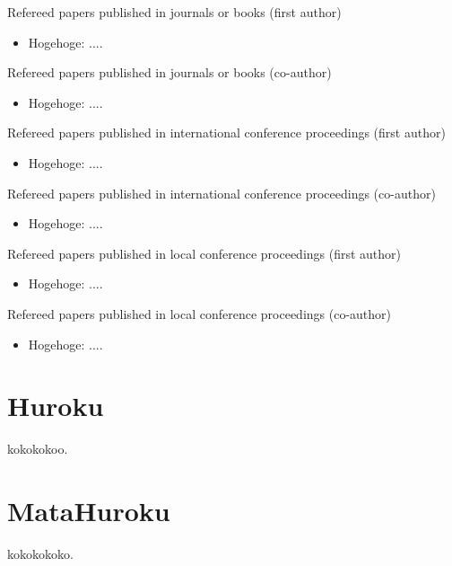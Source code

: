 \documentclass[12pt,dvipdfmx]{report}
\begin{document}
\begin{list}%
 {} %
 {} %
 \item Refereed papers published in journals or books (first author)
       \begin{itemize}
	\item Hogehoge: ....
       \end{itemize}
 \item Refereed papers published in journals or books (co-author)
       \begin{itemize}
	\item Hogehoge: ....
       \end{itemize}
 \item Refereed papers published in international conference proceedings (first author)       \begin{itemize}
	\item Hogehoge: ....
       \end{itemize}

 \item Refereed papers published in international conference proceedings (co-author)
       \begin{itemize}
	\item Hogehoge: ....
       \end{itemize}
 \item Refereed papers published in local conference proceedings (first author)
       \begin{itemize}
	\item Hogehoge: ....
       \end{itemize}
 \item Refereed papers published in local conference proceedings (co-author)
       \begin{itemize}
	\item Hogehoge: ....
       \end{itemize}
\end{list}






\renewcommand{\thesection}{\Alph{section}}
\appendix
{}
\chapter{Huroku}

kokokokoo.

\chapter{MataHuroku}

kokokokoko.


\end{document}
